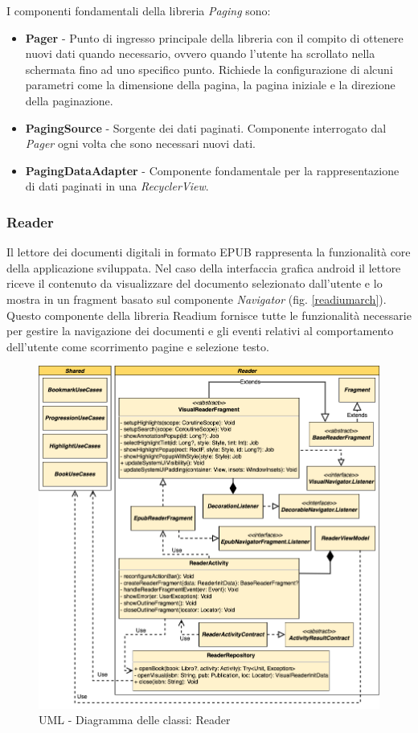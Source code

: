 I componenti fondamentali della libreria \textit{Paging} sono:
\begin{itemize}
    \item \textbf{Pager} - Punto di ingresso principale della libreria con il compito di ottenere nuovi dati quando necessario, ovvero quando l'utente ha scrollato nella schermata fino ad uno specifico punto. Richiede la configurazione di alcuni parametri come la dimensione della pagina, la pagina iniziale e la direzione della paginazione. 
    \item \textbf{PagingSource} - Sorgente dei dati paginati. Componente interrogato dal \textit{Pager} ogni volta che sono necessari nuovi dati.
    \item \textbf{PagingDataAdapter} - Componente fondamentale per la rappresentazione di dati paginati in una \textit{RecyclerView}.
\end{itemize}

\subsubsection*{Reader}
Il lettore dei documenti digitali in formato EPUB rappresenta la funzionalità core della applicazione sviluppata. Nel caso della interfaccia grafica android il lettore riceve il contenuto da visualizzare del documento selezionato dall'utente e lo mostra in un fragment basato sul componente \textit{Navigator} (fig. \ref{readiumarch}). Questo componente della libreria Readium fornisce tutte le funzionalità necessarie per gestire la navigazione dei documenti e gli eventi relativi al comportamento dell'utente come scorrimento pagine e selezione testo.

    \begin{figure}[H]
        \centering
        \includegraphics[width=1\textwidth]{img/reader-uml.png}
        \caption{UML - Diagramma delle classi: Reader}
        \label{reader-uml}
    \end{figure}

